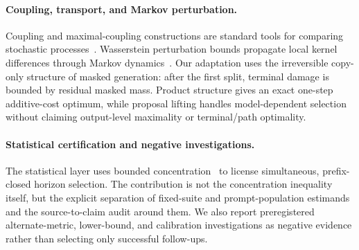 \paragraph{Coupling, transport, and Markov perturbation.}
Coupling and maximal-coupling constructions are standard tools for comparing stochastic processes~\citep{lindvall1992coupling}. Wasserstein perturbation bounds propagate local kernel differences through Markov dynamics~\citep{villani2009optimal,ollivier2009ricci,rudolf2018perturbation}. Our adaptation uses the irreversible copy-only structure of masked generation: after the first split, terminal damage is bounded by residual masked mass. Product structure gives an exact one-step additive-cost optimum, while proposal lifting handles model-dependent selection without claiming output-level maximality or terminal/path optimality.

\paragraph{Statistical certification and negative investigations.}
The statistical layer uses bounded concentration~\citep{hoeffding1963probability} to license simultaneous, prefix-closed horizon selection. The contribution is not the concentration inequality itself, but the explicit separation of fixed-suite and prompt-population estimands and the source-to-claim audit around them. We also report preregistered alternate-metric, lower-bound, and calibration investigations as negative evidence rather than selecting only successful follow-ups.
